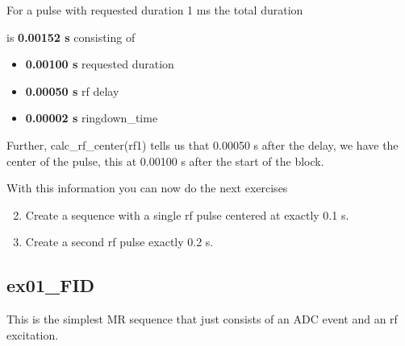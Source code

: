 \documentclass[a4paper,12pt]{extarticle}
\begin{document}
For a pulse with requested duration 1 ms the total duration

is\textbf{ 0.00152 s} consisting of 
\begin{itemize}
    \item \textbf{0.00100 s}  requested duration
    \item \textbf{0.00050 s} rf  delay
    \item \textbf{0.00002 s} ringdown\_time
\end{itemize}
Further, calc\_rf\_center(rf1) tells us that 0.00050 s after the delay, we have the center of the pulse, this at 0.00100 s  after the start of the block.

With this information you can now do the next exercises

\begin{enumerate}
\setcounter{enumi}{1}

\item 	Create a sequence with a single rf pulse centered at exactly 0.1 s. 
\item 	Create a second rf pulse exactly 0.2 s. 

\end{enumerate}

\newpage
\subsection{ex01\_FID}
This is  the simplest MR sequence that just consists of an ADC event and an rf excitation.
\end{document}
